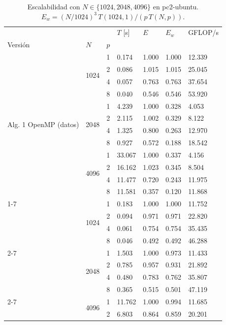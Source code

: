 \begin{table}[H]
\centering\small
\caption{Escalabilidad con $N\in\{1024, 2048, 4096\}$ en pc2-ubuntu. $E_w = (N/1024)^3\,T(1024,1)/(p\,T(N,p))$.}
\label{tab:f_escalabilidad_pc2-ubuntu}
\begin{tabular}{lllllll}
\toprule
 &  &  & $T$ [s] & $E$ & $E_w$ & GFLOP/s \\
Versión & $N$ & $p$ &  &  &  &  \\
\midrule
\multirow[t]{12}{*}{Alg. 1 OpenMP (datos)} & \multirow[t]{4}{*}{1024} & 1 & 0.174 & 1.000 & 1.000 & 12.339 \\
 &  & 2 & 0.086 & 1.015 & 1.015 & 25.045 \\
 &  & 4 & 0.057 & 0.763 & 0.763 & 37.654 \\
 &  & 8 & 0.040 & 0.546 & 0.546 & 53.920 \\
\cline{2-7}
 & \multirow[t]{4}{*}{2048} & 1 & 4.239 & 1.000 & 0.328 & 4.053 \\
 &  & 2 & 2.115 & 1.002 & 0.329 & 8.122 \\
 &  & 4 & 1.325 & 0.800 & 0.263 & 12.970 \\
 &  & 8 & 0.927 & 0.572 & 0.188 & 18.542 \\
\cline{2-7}
 & \multirow[t]{4}{*}{4096} & 1 & 33.067 & 1.000 & 0.337 & 4.156 \\
 &  & 2 & 16.162 & 1.023 & 0.345 & 8.504 \\
 &  & 4 & 11.477 & 0.720 & 0.243 & 11.975 \\
 &  & 8 & 11.581 & 0.357 & 0.120 & 11.868 \\
\cline{1-7} \cline{2-7}
\multirow[t]{12}{*}{Alg. 2 OpenMP (D\&C tareas)} & \multirow[t]{4}{*}{1024} & 1 & 0.183 & 1.000 & 1.000 & 11.752 \\
 &  & 2 & 0.094 & 0.971 & 0.971 & 22.820 \\
 &  & 4 & 0.061 & 0.754 & 0.754 & 35.435 \\
 &  & 8 & 0.046 & 0.492 & 0.492 & 46.288 \\
\cline{2-7}
 & \multirow[t]{4}{*}{2048} & 1 & 1.503 & 1.000 & 0.973 & 11.433 \\
 &  & 2 & 0.785 & 0.957 & 0.931 & 21.892 \\
 &  & 4 & 0.480 & 0.783 & 0.762 & 35.807 \\
 &  & 8 & 0.365 & 0.515 & 0.501 & 47.119 \\
\cline{2-7}
 & \multirow[t]{4}{*}{4096} & 1 & 11.762 & 1.000 & 0.994 & 11.685 \\
 &  & 2 & 6.803 & 0.864 & 0.859 & 20.201 \\

\end{tabular}
\end{table}
